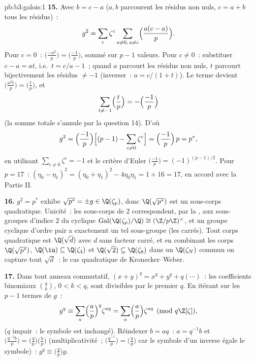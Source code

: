\begin{solution}{pb:b3:galois:1}
\textbf{15.} Avec $b = c - a$ ($a, b$ parcourent les résidus
non nuls, $c = a + b$ tous les résidus)~:
\[
g^2 = \sum_c\zeta^c\sum_{a\neq0,\,a\neq c}
\Bigl(\frac{a(c-a)}p\Bigr) .
\]
Pour $c = 0$~: $\bigl(\frac{-a^2}p\bigr) =
\bigl(\frac{-1}p\bigr)$, sommé sur $p - 1$ valeurs. Pour $c
\neq 0$~: substituer $c - a = at$, i.e.\ $t = c/a - 1$~;
quand $a$ parcourt les résidus non nuls, $t$ parcourt
bijectivement les résidus $\neq -1$ (inverser~: $a = c/(1 +
t)$). Le terme devient $\bigl(\frac{a^2t}p\bigr) =
\bigl(\frac tp\bigr)$, et
\[
\sum_{t \neq -1}\Bigl(\frac tp\Bigr)
= -\Bigl(\frac{-1}p\Bigr)
\]
(la somme totale s'annule par la question 14). D'où
\[
g^2 = \Bigl(\frac{-1}p\Bigr)\Bigl[(p-1) -
\sum_{c\neq0}\zeta^c\Bigr]
= \Bigl(\frac{-1}p\Bigr)\,p = p^* ,
\]
en utilisant $\sum_{c\neq0}\zeta^c = -1$ et le critère
d'Euler $\bigl(\frac{-1}p\bigr) = (-1)^{(p-1)/2}$. Pour $p =
17$~: $(\eta_0 - \eta_1)^2 = (\eta_0 + \eta_1)^2 -
4\eta_0\eta_1 = 1 + 16 = 17$, en accord avec la Partie II.

\textbf{16.} $g^2 = p^*$ exhibe $\sqrt{p^*} = \pm g \in
\Q(\zeta_p)$, donc $\Q(\sqrt{p^*})$ est un sous-corps
quadratique. Unicité~: les sous-corps de  $2$
correspondent, par la , aux
sous-groupes d'indice $2$ du cyclique
$\operatorname{Gal}(\Q(\zeta_p)/\Q) \cong (\Z/p\Z)^\times$,
et un groupe cyclique d'ordre pair a exactement un tel
sous-groupe (les carrés). Tout corps quadratique est
$\Q(\sqrt{d})$ avec $d$ sans facteur carré, et en combinant
les corps $\Q(\sqrt{p^*})$, $\Q(\iu) \subseteq \Q(\zeta_4)$
et $\Q(\sqrt2) \subseteq \Q(\zeta_8)$ dans un
$\Q(\zeta_N)$ commun on capture tout $\sqrt d$~: le cas
quadratique de Kronecker--Weber.

\textbf{17.} Dans tout anneau commutatif, $(x + y)^q = x^q +
y^q + q(\cdots)$~: les coefficients binomiaux $\binom qk$, $0
< k < q$, sont divisibles par le premier $q$. En itérant sur
les $p - 1$ termes de $g$~:
\[
g^q \equiv \sum_{a}\Bigl(\frac ap\Bigr)^{q}\zeta^{aq}
= \sum_a\Bigl(\frac ap\Bigr)\zeta^{aq}
\pmod{q\Z[\zeta]},
\]
($q$ impair~: le symbole est inchangé). Réindexer $b = aq$~:
$a = q^{-1}b$ et $\bigl(\frac{q^{-1}b}p\bigr) =
\bigl(\frac{q}p\bigr)\bigl(\frac bp\bigr)$
(multiplicativité~; $\bigl(\frac{q^{-1}}p\bigr) =
\bigl(\frac qp\bigr)$ car le symbole d'un inverse égale le
symbole)~: $g^q \equiv \bigl(\frac qp\bigr)g$.


\end{solution}
